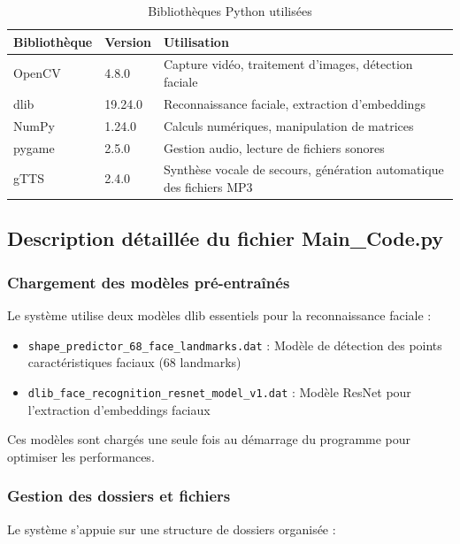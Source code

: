 \documentclass[12pt,a4paper]{article}
\begin{document}
\begin{table}[H]
\centering
\begin{tabular}{@{}llp{6cm}@{}}
\toprule
\textbf{Bibliothèque} & \textbf{Version} & \textbf{Utilisation} \\
\midrule
OpenCV & 4.8.0 & Capture vidéo, traitement d'images, détection faciale \\
dlib & 19.24.0 & Reconnaissance faciale, extraction d'embeddings \\
NumPy & 1.24.0 & Calculs numériques, manipulation de matrices \\
pygame & 2.5.0 & Gestion audio, lecture de fichiers sonores \\
 gTTS & 2.4.0 & Synthèse vocale de secours, génération automatique des fichiers MP3 \\
\bottomrule
\end{tabular}
\caption{Bibliothèques Python utilisées}
\label{tab:libraries}
\end{table}

\subsection{Description détaillée du fichier Main\_Code.py}

\subsubsection{Chargement des modèles pré-entraînés}

Le système utilise deux modèles dlib essentiels pour la reconnaissance faciale :

\begin{itemize}
\item \texttt{shape\_predictor\_68\_face\_landmarks.dat} : Modèle de détection des points caractéristiques faciaux (68 landmarks)
\item \texttt{dlib\_face\_recognition\_resnet\_model\_v1.dat} : Modèle ResNet pour l'extraction d'embeddings faciaux
\end{itemize}

Ces modèles sont chargés une seule fois au démarrage du programme pour optimiser les performances.

\subsubsection{Gestion des dossiers et fichiers}

Le système s'appuie sur une structure de dossiers organisée :
\end{document}
